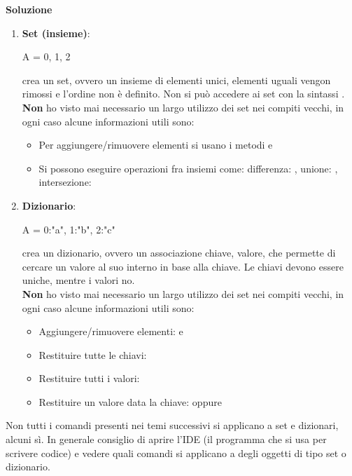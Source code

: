 \documentclass[10pt]{extarticle}
\makeatletter
\newcommand{\<}{\langle}
\renewcommand{\>}{\rangle}
\renewenvironment{proof}[1][\proofname] {\par\pushQED{\qed}
\renewcommand*{\proofname}{Soluzione}
{\normalfont\sffamily\bfseries\topsep6\p@\@plus6\p@\relax #1\@addpunct{.} }}{\popQED\endtrivlist\@endpefalse}
\theoremstyle{mystyle}{\newtheorem*{remark}{Nota}}
\theoremstyle{mystyle}{\newtheorem*{remarks}{Note}}
\theoremstyle{mystyle}{\newtheorem*{example}{Esempio}}
\theoremstyle{mystyle}{\newtheorem*{examples}{Esempi}}
\theoremstyle{definition}{\newtheorem*{exercise}{Exercise}}
\theoremstyle{warn}
\makeatother
\begin{document}
\begin{proof}
\begin{enumerate}
    \item \textbf{Set (insieme)}:
    \begin{python}
A = {0, 1, 2}
    \end{python}
    crea un set, ovvero un insieme di elementi unici, elementi uguali vengon rimossi e l'ordine non è definito. Non si può accedere ai set con la sintassi .\\
    \textbf{Non} ho visto mai necessario un largo utilizzo dei set nei compiti vecchi, in ogni caso alcune informazioni utili sono:
    \begin{itemize}
        \item Per aggiungere/rimuovere elementi si usano i metodi  e 
        \item Si possono eseguire operazioni fra insiemi come: differenza: , unione: , intersezione: 
    \end{itemize}
    \item \textbf{Dizionario}:
    \begin{python}
A = {0:"a", 1:"b", 2:"c"}
    \end{python}
    crea un dizionario, ovvero un associazione chiave, valore, che permette di cercare un valore al suo interno in base alla chiave. Le chiavi devono essere uniche, mentre i valori no.\\
    \textbf{Non} ho visto mai necessario un largo utilizzo dei set nei compiti vecchi, in ogni caso alcune informazioni utili sono:
    \begin{itemize}
    \item Aggiungere/rimuovere elementi:  e 
    \item Restituire tutte le chiavi: 
    \item Restituire tutti i valori: 
    \item Restituire un valore data la chiave:  oppure 
    \end{itemize}
\end{enumerate}
\end{proof}
\begin{remark}
Non tutti i comandi presenti nei temi successivi si applicano a set e dizionari, alcuni sì. In generale consiglio di aprire l'IDE (il programma che si usa per scrivere codice) e vedere quali comandi si applicano a degli oggetti di tipo set o dizionario.
\end{remark}
\end{document}
